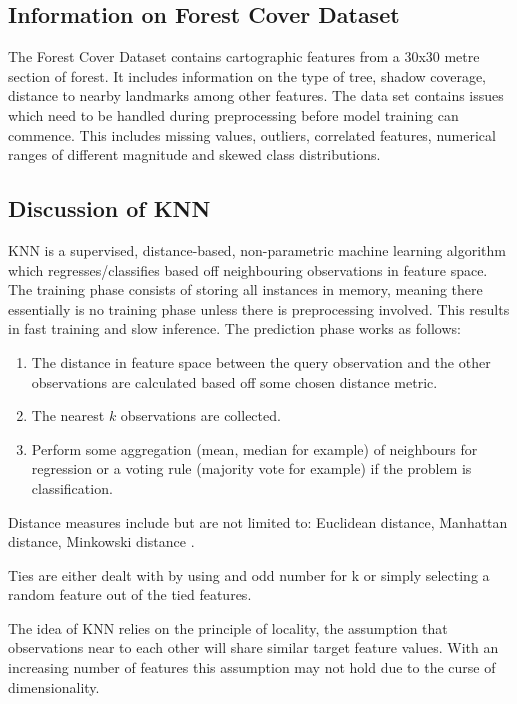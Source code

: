 \documentclass[conference]{IEEEtran}
\begin{document}
\subsection{Information on Forest Cover Dataset}

The Forest Cover Dataset contains cartographic features from a 30x30 metre section of forest. It includes information on the type of tree, shadow coverage, distance to nearby landmarks among other features. The data set contains issues which need to be handled during preprocessing before model training can commence. This includes missing values, outliers, correlated features, numerical ranges of different magnitude and skewed class distributions.

\subsection{Discussion of KNN}

KNN is a supervised, distance-based, non-parametric machine learning algorithm which regresses/classifies based off neighbouring observations in feature space. The training phase consists of storing all instances in memory\cite[p.~187]{fundamentals}, meaning there essentially is no training phase unless there is preprocessing involved. This results in fast training and slow inference. The prediction phase works as follows: 

\begin{enumerate}
	\item The distance in feature space between the query observation and the other observations are calculated based off some chosen distance metric.
	\item The nearest $k$ observations are collected.
	\item Perform some aggregation (mean, median for example) of neighbours for regression or a voting rule (majority vote \cite[p.~192]{fundamentals} for example) if the problem is classification.
\end{enumerate}

Distance measures include but are not limited to: Euclidean distance, Manhattan distance, Minkowski distance \cite[p.~11]{similarity}.

Ties are either dealt with by using and odd number for k or simply selecting a random feature out of the tied features\cite[p.~7]{similarity}.

The idea of KNN relies on the principle of locality, the assumption that observations near to each other will share similar target feature values. With an increasing number of features this assumption may not hold due to the curse of dimensionality.
 
\end{document}
